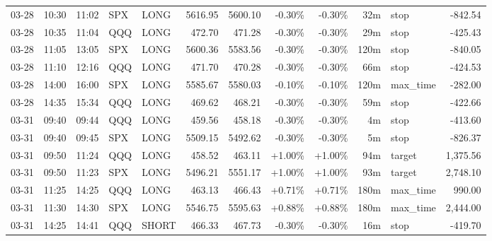 \documentclass[11pt,a4paper,twoside]{article}
\begin{document}
\begin{center}
\begin{longtable}{>{\color{txtmain}}l l l l l r r r r r >{\color{txtmain}}l r}
03-28 & 10:30 & 11:02 & SPX & LONG & 5616.95 & 5600.10 & \textcolor{lossred}{-0.30\%} & \textcolor{lossred}{-0.30\%} & 32m & stop & \textcolor{lossred}{-842.54} \\
03-28 & 10:35 & 11:04 & QQQ & LONG & 472.70 & 471.28 & \textcolor{lossred}{-0.30\%} & \textcolor{lossred}{-0.30\%} & 29m & stop & \textcolor{lossred}{-425.43} \\
03-28 & 11:05 & 13:05 & SPX & LONG & 5600.36 & 5583.56 & \textcolor{lossred}{-0.30\%} & \textcolor{lossred}{-0.30\%} & 120m & stop & \textcolor{lossred}{-840.05} \\
03-28 & 11:10 & 12:16 & QQQ & LONG & 471.70 & 470.28 & \textcolor{lossred}{-0.30\%} & \textcolor{lossred}{-0.30\%} & 66m & stop & \textcolor{lossred}{-424.53} \\
03-28 & 14:00 & 16:00 & SPX & LONG & 5585.67 & 5580.03 & \textcolor{lossred}{-0.10\%} & \textcolor{lossred}{-0.10\%} & 120m & max\_time & \textcolor{lossred}{-282.00} \\
03-28 & 14:35 & 15:34 & QQQ & LONG & 469.62 & 468.21 & \textcolor{lossred}{-0.30\%} & \textcolor{lossred}{-0.30\%} & 59m & stop & \textcolor{lossred}{-422.66} \\
03-31 & 09:40 & 09:44 & QQQ & LONG & 459.56 & 458.18 & \textcolor{lossred}{-0.30\%} & \textcolor{lossred}{-0.30\%} & 4m & stop & \textcolor{lossred}{-413.60} \\
03-31 & 09:40 & 09:45 & SPX & LONG & 5509.15 & 5492.62 & \textcolor{lossred}{-0.30\%} & \textcolor{lossred}{-0.30\%} & 5m & stop & \textcolor{lossred}{-826.37} \\
03-31 & 09:50 & 11:24 & QQQ & LONG & 458.52 & 463.11 & \textcolor{wingreen}{+1.00\%} & \textcolor{wingreen}{+1.00\%} & 94m & target & \textcolor{wingreen}{1,375.56} \\
03-31 & 09:50 & 11:23 & SPX & LONG & 5496.21 & 5551.17 & \textcolor{wingreen}{+1.00\%} & \textcolor{wingreen}{+1.00\%} & 93m & target & \textcolor{wingreen}{2,748.10} \\
03-31 & 11:25 & 14:25 & QQQ & LONG & 463.13 & 466.43 & \textcolor{wingreen}{+0.71\%} & \textcolor{wingreen}{+0.71\%} & 180m & max\_time & \textcolor{wingreen}{990.00} \\
03-31 & 11:30 & 14:30 & SPX & LONG & 5546.75 & 5595.63 & \textcolor{wingreen}{+0.88\%} & \textcolor{wingreen}{+0.88\%} & 180m & max\_time & \textcolor{wingreen}{2,444.00} \\
03-31 & 14:25 & 14:41 & QQQ & SHORT & 466.33 & 467.73 & \textcolor{lossred}{-0.30\%} & \textcolor{lossred}{-0.30\%} & 16m & stop & \textcolor{lossred}{-419.70} \\

\end{longtable}
\end{center}
\end{document}
